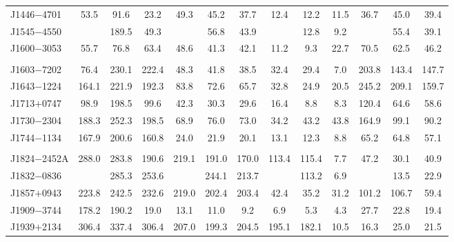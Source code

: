 \begin{landscape}
\begin{table}
\begin{center}
\begin{tabular}{lcccccccccccc}
J1446$-$4701     & 53.5  &  91.6  &  23.2   &   49.3      & 45.2   & 37.7   & 12.4  & 12.2  & 11.5    &  36.7   &  45.0   & 39.4    \\
J1545$-$4550     &       &  189.5 &  49.3   &             & 56.8   & 43.9   &       & 12.8  & 9.2     &         &  55.4   & 39.1    \\
J1600$-$3053     & 55.7  &  76.8  &  63.4   &   48.6      & 41.3   & 42.1   & 11.2  & 9.3   & 22.7    &  70.5   &  62.5   & 46.2    \\
	               &       &        &         &             &        &        &       &       &         &         &         &         \\     
J1603$-$7202     & 76.4  &  230.1 &  222.4  &   48.3      & 41.8   & 38.5   & 32.4  & 29.4  & 7.0     &  203.8  &  143.4  & 147.7   \\
J1643$-$1224     & 164.1 &  221.9 &  192.3  &   83.8      & 72.6   & 65.7   & 32.8  & 24.9  & 20.5    &  245.2  &  209.1  & 159.7   \\
J1713$+$0747     & 98.9  &  198.5 &  99.6   &   42.3      & 30.3   & 29.6   & 16.4  & 8.8   & 8.3     &  120.4  &  64.6   & 58.6    \\
J1730$-$2304     & 188.3 &  252.3 &  198.5  &   68.9      & 76.0   & 73.0   & 34.2  & 43.2  & 43.8    &  164.9  &  99.1   & 90.2    \\
J1744$-$1134     & 167.9 &  200.6 &  160.8  &   24.0      & 21.9   & 20.1   & 13.1  & 12.3  & 8.8     &  65.2   &  64.8   & 57.1    \\
	               &       &        &         &             &        &        &       &       &         &         &         &         \\     
J1824$-$2452A    & 288.0 &  283.8 &  190.6  &   219.1     & 191.0  & 170.0  & 113.4 &115.4  &7.7      &  47.2   &  30.1   & 40.9    \\
J1832$-$0836     &       &  285.3 &  253.6  &             & 244.1  & 213.7  &       & 113.2 &  6.9    &         &  13.5   & 22.9    \\
J1857$+$0943     & 223.8 &  242.5 &  232.6  &   219.0     & 202.4  & 203.4  & 42.4  & 35.2  & 31.2    &  101.2  &  106.7  & 59.4    \\
J1909$-$3744     & 178.2 &  190.2 &  19.0   &   13.1      & 11.0   & 9.2    & 6.9   &  5.3  & 4.3     &  27.7   &  22.8   & 19.4    \\
J1939$+$2134     & 306.4 &  337.4 &  306.4  &   207.0     & 199.3  & 204.5  & 195.1 &182.1  & 10.5    &  16.3   &  25.0   & 21.5    \\

\end{tabular}
\end{center}
\end{table}
\end{landscape}
